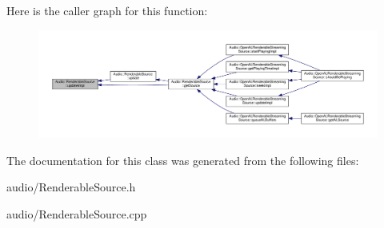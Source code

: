 Here is the caller graph for this function\+:
\nopagebreak
\begin{figure}[H]
\begin{center}
\leavevmode
\includegraphics[width=350pt]{d0/de7/classAudio_1_1RenderableSource_ab13a51dbcd65af4fcdb69dd9da296ca7_icgraph}
\end{center}
\end{figure}




The documentation for this class was generated from the following files\+:\begin{DoxyCompactItemize}
\item 
audio/Renderable\+Source.\+h\item 
audio/Renderable\+Source.\+cpp\end{DoxyCompactItemize}
